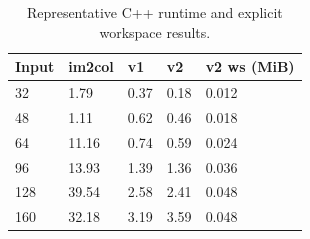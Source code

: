 \begin{table}[t]
\centering
\caption{Representative C++ runtime and explicit workspace results.}
\label{tab:cpp-runtime}
\begin{tabular}{lllll}
\toprule
Input & im2col & v1 & v2 & v2 ws (MiB) \\
\midrule
32 & 1.79 & 0.37 & 0.18 & 0.012 \\
48 & 1.11 & 0.62 & 0.46 & 0.018 \\
64 & 11.16 & 0.74 & 0.59 & 0.024 \\
96 & 13.93 & 1.39 & 1.36 & 0.036 \\
128 & 39.54 & 2.58 & 2.41 & 0.048 \\
160 & 32.18 & 3.19 & 3.59 & 0.048 \\
\bottomrule
\end{tabular}
\end{table}
